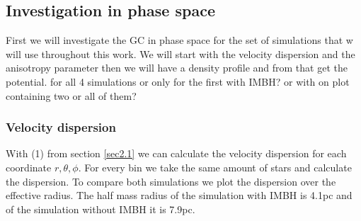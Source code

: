 \subsection{Investigation in phase space}

First we will investigate the \ac{GC} in phase space for the set of simulations that w will use throughout this work. We will start with the velocity dispersion and the anisotropy parameter then we will have a density profile and from that get the potential. \color{red} for all 4 simulations or only for the first with IMBH? or with on plot containing two or all of them? \color{black}

\subsubsection{Velocity dispersion}
With (1) from section \ref{sec2.1} we can calculate the velocity dispersion for each coordinate \(r,\theta,\phi\). For every bin we take the same amount of stars and calculate the dispersion. To compare both simulations we plot the dispersion over the effective radius. The half mass radius of the simulation with \ac{IMBH} is 4.1pc and of the simulation without \ac{IMBH} it is 7.9pc. 
